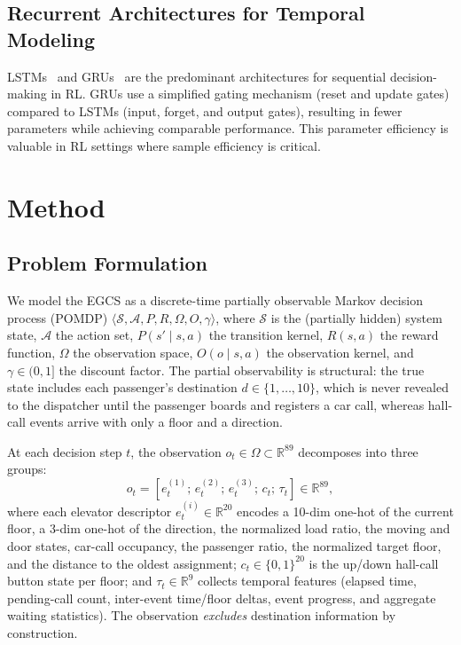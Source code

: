 \documentclass[conference]{IEEEtran}
\begin{document}
\subsection{Recurrent Architectures for Temporal Modeling}

LSTMs~\cite{hochreiter1997long} and GRUs~\cite{cho2014learning} are
the predominant architectures for sequential decision-making in RL.
GRUs use a simplified gating mechanism (reset and update gates)
compared to LSTMs (input, forget, and output gates), resulting in
fewer parameters while achieving comparable performance. This
parameter efficiency is valuable in RL settings where sample
efficiency is critical.

\section{Method}
\label{sec:method}

\subsection{Problem Formulation}

We model the EGCS as a discrete-time partially observable Markov
decision process (POMDP) $\langle \mathcal{S}, \mathcal{A}, P, R,
\Omega, O, \gamma \rangle$, where $\mathcal{S}$ is the (partially
hidden) system state, $\mathcal{A}$ the action set, $P(s' \mid s, a)$
the transition kernel, $R(s, a)$ the reward function, $\Omega$ the
observation space, $O(o \mid s, a)$ the observation kernel, and
$\gamma \in (0, 1]$ the discount factor. The partial observability
is structural: the true state includes each passenger's destination
$d \in \{1, \dots, 10\}$, which is never revealed to the dispatcher
until the passenger boards and registers a car call, whereas
hall-call events arrive with only a floor and a direction.

At each decision step $t$, the observation $o_t \in \Omega \subset
\mathbb{R}^{89}$ decomposes into three groups:
\begin{equation}
o_t = \left[ e_t^{(1)};\, e_t^{(2)};\, e_t^{(3)};\, c_t;\, \tau_t
\right] \in \mathbb{R}^{89},
\end{equation}
where each elevator descriptor $e_t^{(i)} \in \mathbb{R}^{20}$
encodes a 10-dim one-hot of the current floor, a 3-dim one-hot of the
direction, the normalized load ratio, the moving and door states,
car-call occupancy, the passenger ratio, the normalized target floor,
and the distance to the oldest assignment; $c_t \in \{0,1\}^{20}$ is
the up/down hall-call button state per floor; and
$\tau_t \in \mathbb{R}^{9}$ collects temporal features (elapsed time,
pending-call count, inter-event time/floor deltas, event progress,
and aggregate waiting statistics). The observation \emph{excludes}
destination information by construction.
\end{document}
